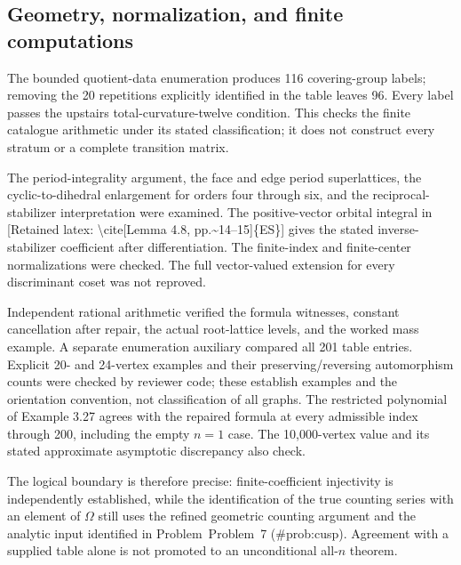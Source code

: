 \documentclass[10pt]{article}
\begin{document}
\subsection*{Geometry, normalization, and finite computations}
The bounded quotient-data enumeration produces 116 covering-group labels; removing the 20 repetitions explicitly identified in the table leaves 96. Every label passes the upstairs total-curvature-twelve condition. This checks the finite catalogue arithmetic under its stated classification; it does not construct every stratum or a complete transition matrix.\par
The period-integrality argument, the face and edge period superlattices, the cyclic-to-dihedral enlargement for orders four through six, and the reciprocal-stabilizer interpretation were examined. The positive-vector orbital integral in [Retained latex: \textbackslash{}cite[Lemma 4.8, pp.\textasciitilde{}14--15]\{ES\}] gives the stated inverse-stabilizer coefficient after differentiation. The finite-index and finite-center normalizations were checked. The full vector-valued extension for every discriminant coset was not reproved.\par
Independent rational arithmetic verified the formula witnesses, constant cancellation after repair, the actual root-lattice levels, and the worked mass example. A separate enumeration auxiliary compared all 201 table entries. Explicit 20- and 24-vertex examples and their preserving/reversing automorphism counts were checked by reviewer code; these establish examples and the orientation convention, not classification of all graphs. The restricted polynomial of Example 3.27 agrees with the repaired formula at every admissible index through 200, including the empty \(n=1\) case. The 10,000-vertex value and its stated approximate asymptotic discrepancy also check.\par
The logical boundary is therefore precise: finite-coefficient injectivity is independently established, while the identification of the true counting series with an element of \(\Omega\) still uses the refined geometric counting argument and the analytic input identified in Problem Problem 7 (\#prob:cusp). Agreement with a supplied table alone is not promoted to an unconditional all-\(n\) theorem.\par
\end{document}
